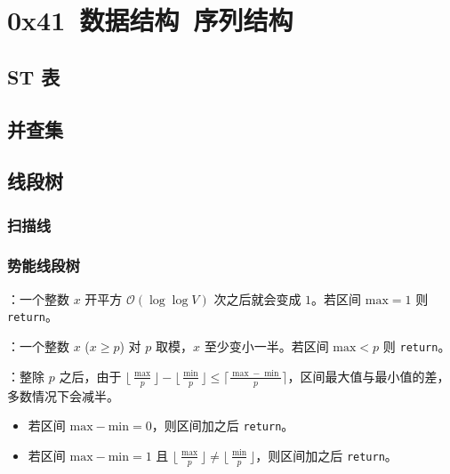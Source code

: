 \section{0x41\ 数据结构\ 序列结构}
\label{sec:0x41}

\subsection{ST 表}


\subsection{并查集}


\subsection{线段树}

\subsubsection{扫描线}



\subsubsection{势能线段树}

：一个整数 $x$ 开平方 $\mathcal{O}(\log \log V)$ 次之后就会变成 $1$。若区间 $\mathrm{max} = 1$ 则 \texttt{return}。

：一个整数 $x$ ($x \ge p$) 对 $p$ 取模，$x$ 至少变小一半。若区间 $\mathrm{max} < p$ 则 \texttt{return}。

：整除 $p$ 之后，由于 $\lfloor \frac{\max}{p} \rfloor - \lfloor \frac{\min}{p} \rfloor \leq \lceil \frac{\max - \min}{p} \rceil$，区间最大值与最小值的差，多数情况下会减半。

\begin{itemize}
    \item 若区间 $\mathrm{max} - \mathrm{min} = 0$，则区间加之后 \texttt{return}。
    \item 若区间 $\mathrm{max} - \mathrm{min} = 1$ 且 $\lfloor \frac{\mathrm{\max}}{p} \rfloor \neq \lfloor \frac{\mathrm{\min}}{p} \rfloor$，则区间加之后 \texttt{return}。
\end{itemize}

